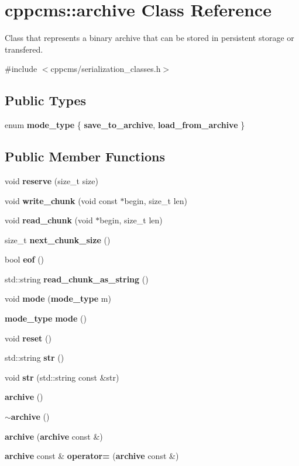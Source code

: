 \section{cppcms\-:\-:archive Class Reference}
\label{classcppcms_1_1archive}


Class that represents a binary archive that can be stored in persistent storage or transfered.  




{\ttfamily \#include $<$cppcms/serialization\-\_\-classes.\-h$>$}

\subsection*{Public Types}
\begin{DoxyCompactItemize}
\item 
enum {\bf mode\-\_\-type} \{ {\bfseries save\-\_\-to\-\_\-archive}, 
{\bfseries load\-\_\-from\-\_\-archive}
 \}
\end{DoxyCompactItemize}
\subsection*{Public Member Functions}
\begin{DoxyCompactItemize}
\item 
void {\bf reserve} (size\-\_\-t size)
\item 
void {\bf write\-\_\-chunk} (void const $\ast$begin, size\-\_\-t len)
\item 
void {\bf read\-\_\-chunk} (void $\ast$begin, size\-\_\-t len)
\item 
size\-\_\-t {\bf next\-\_\-chunk\-\_\-size} ()
\item 
bool {\bf eof} ()
\item 
std\-::string {\bf read\-\_\-chunk\-\_\-as\-\_\-string} ()
\item 
void {\bf mode} ({\bf mode\-\_\-type} m)
\item 
{\bf mode\-\_\-type} {\bf mode} ()
\item 
void {\bf reset} ()
\item 
std\-::string {\bf str} ()
\item 
void {\bf str} (std\-::string const \&str)
\item 
{\bf archive} ()
\item 
{\bf $\sim$archive} ()
\item 
{\bf archive} ({\bf archive} const \&)
\item 
{\bf archive} const \& {\bf operator=} ({\bf archive} const \&)
\end{DoxyCompactItemize}


